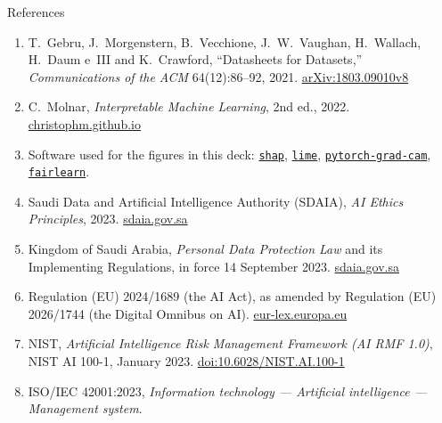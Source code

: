 \begin{frame}[allowframebreaks]{References}
\begin{enumerate}
          \href{https://arxiv.org/abs/1810.03993v2}{arXiv:1810.03993v2}
    \item T.~Gebru, J.~Morgenstern, B.~Vecchione, J.~W.~Vaughan, H.~Wallach, H.~Daum e~III
          and K.~Crawford, ``Datasheets for Datasets,'' \emph{Communications of the ACM}
          64(12):86--92, 2021. \href{https://arxiv.org/abs/1803.09010v8}{arXiv:1803.09010v8}
    \item C.~Molnar, \emph{Interpretable Machine Learning}, 2nd ed., 2022.
          \href{https://christophm.github.io/interpretable-ml-book/}{christophm.github.io}
    \item Software used for the figures in this deck:
          \href{https://github.com/shap/shap}{\texttt{shap}},
          \href{https://github.com/marcotcr/lime}{\texttt{lime}},
          \href{https://github.com/jacobgil/pytorch-grad-cam}{\texttt{pytorch-grad-cam}},
          \href{https://fairlearn.org/}{\texttt{fairlearn}}.
    \item Saudi Data and Artificial Intelligence Authority (SDAIA), \emph{AI Ethics Principles}, 2023.
          \href{https://sdaia.gov.sa}{sdaia.gov.sa}
    \item Kingdom of Saudi Arabia, \emph{Personal Data Protection Law} and its Implementing Regulations,
          in force 14 September 2023. \href{https://sdaia.gov.sa}{sdaia.gov.sa}
    \item Regulation (EU) 2024/1689 (the AI Act), as amended by Regulation (EU) 2026/1744 (the Digital
          Omnibus on AI). \href{https://eur-lex.europa.eu}{eur-lex.europa.eu}
    \item NIST, \emph{Artificial Intelligence Risk Management Framework (AI RMF 1.0)}, NIST AI 100-1,
          January 2023. \href{https://doi.org/10.6028/NIST.AI.100-1}{doi:10.6028/NIST.AI.100-1}
    \item ISO/IEC 42001:2023, \emph{Information technology --- Artificial intelligence --- Management
          system}.
  \end{enumerate}
\end{frame}
